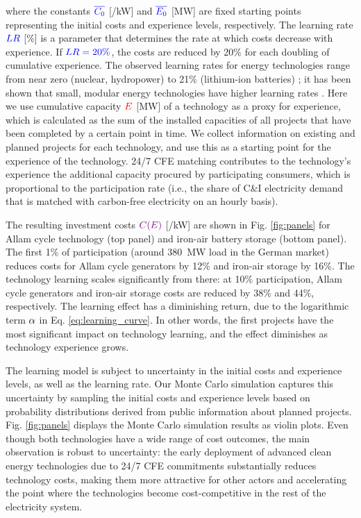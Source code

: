 \documentclass[pdflatex,sn-basic, Numbered]{sn-jnl}
\theoremstyle{thmstyleone}%
\theoremstyle{thmstyletwo}%
\theoremstyle{thmstylethree}%
\begin{document}
\noindent where the constants $\color{blue}\overline{C_0}$ [\officialeuro/kW] and $\color{blue}\overline{E_0}$ [MW] are fixed starting points representing the initial costs and experience levels, respectively. The learning rate $\color{blue}LR$ [\%] is a parameter that determines the rate at which costs decrease with experience.
If $\color{blue}LR=20\%$, the costs are reduced by 20\% for each doubling of cumulative experience.
The observed learning rates for energy technologies range from near zero (nuclear, hydropower) to 21\% (lithium-ion batteries) \cite{waySuppplementaryMaterialsEmpirically2022}; it has been shown that small, modular energy technologies have higher learning rates \cite{wilsonGranularTechnologiesAccelerate2020}.
Here we use cumulative capacity $\color{red}E$ [MW] of a technology as a proxy for experience, which is calculated as the sum of the installed capacities of all projects that have been completed by a certain point in time.
We collect information on existing and planned projects for each technology, and use this as a starting point for the experience of the technology. 24/7 CFE matching contributes to the technology's experience the additional capacity procured by participating consumers, which is proportional to the participation rate (i.e., the share of C\&I electricity demand that is matched with carbon-free electricity on an hourly basis).

The resulting investment costs $\color{violet}C(E)\color{black}$ [\officialeuro/kW] are shown in Fig. \ref{fig:panels} for Allam cycle technology (top panel) and iron-air battery storage (bottom panel).
The first 1\% of participation (around 380~MW load in the German market) reduces costs for Allam cycle generators by 12\% and iron-air storage by 16\%. The technology learning scales significantly from there: at 10\% participation, Allam cycle generators and iron-air storage costs are reduced by 38\% and 44\%, respectively. The learning effect has a diminishing return, due to the logarithmic term $\color{black}\alpha$ in Eq. \ref{eq:learning_curve}. In other words, the first projects have the most significant impact on technology learning, and the effect diminishes as technology experience grows.

The learning model is subject to uncertainty in the initial costs and experience levels, as well as the learning rate. Our Monte Carlo simulation captures this uncertainty by sampling the initial costs and experience levels based on probability distributions derived from public information about planned projects. Fig. \ref{fig:panels} displays the Monte Carlo simulation results as violin plots. Even though both technologies have a wide range of cost outcomes, the main observation is robust to uncertainty: the early deployment of advanced clean energy technologies due to 24/7 CFE commitments substantially reduces technology costs, making them more attractive for other actors and accelerating the point where the technologies become cost-competitive in the rest of the electricity system.
\end{document}
